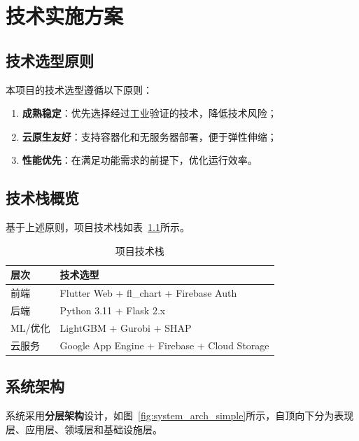 \chapter{技术实施方案}

\section{技术选型原则}

本项目的技术选型遵循以下原则：
\begin{enumerate}
    \item \textbf{成熟稳定}：优先选择经过工业验证的技术，降低技术风险；
    \item \textbf{云原生友好}：支持容器化和无服务器部署，便于弹性伸缩；
    \item \textbf{性能优先}：在满足功能需求的前提下，优化运行效率。
\end{enumerate}

\section{技术栈概览}

基于上述原则，项目技术栈如表~\ref{tab:tech_stack_simple}所示。

\begin{table}[htbp]
    \centering
    \caption{项目技术栈}
    \label{tab:tech_stack_simple}
    \begin{tabular}{l l}
        \toprule
        \textbf{层次} & \textbf{技术选型}                                \\
        \midrule
        前端          & Flutter Web + fl\_chart + Firebase Auth      \\
        后端          & Python 3.11 + Flask 2.x                      \\
        ML/优化       & LightGBM + Gurobi + SHAP                     \\
        云服务         & Google App Engine + Firebase + Cloud Storage \\
        \bottomrule
    \end{tabular}
\end{table}

\section{系统架构}

系统采用\textbf{分层架构}设计，如图~\ref{fig:system_arch_simple}所示，自顶向下分为表现层、应用层、领域层和基础设施层。


